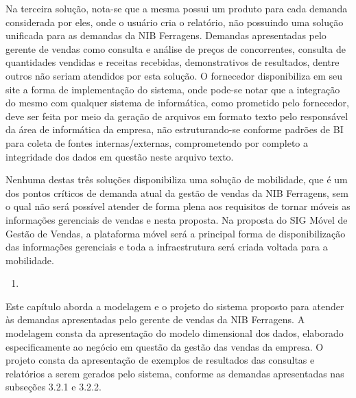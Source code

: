 \documentclass[a4paper]{article}
\newcounter{saveenum}
\newcommand\liststyleWWviiiNumi{%
\renewcommand\theenumi{\arabic{enumi}}
\renewcommand\theenumii{\arabic{enumi}.\arabic{enumii}}
\renewcommand\theenumiii{\arabic{enumi}.\arabic{enumii}.\arabic{enumiii}}
\renewcommand\theenumiv{\arabic{enumi}.\arabic{enumii}.\arabic{enumiii}.\arabic{enumiv}}
\renewcommand\labelenumi{\theenumi}
\renewcommand\labelenumii{\theenumii}
\renewcommand\labelenumiii{\theenumiii}
\renewcommand\labelenumiv{\theenumiv.}
}
\begin{document}
{
\textsf{Na terceira solu\c{c}\~ao, nota-se que a mesma possui um produto para cada demanda considerada por eles, onde o
usu\'ario cria o relat\'orio, n\~ao possuindo uma solu\c{c}\~ao unificada para as demandas da NIB Ferragens. Demandas
apresentadas pelo gerente de vendas como consulta e an\'alise de pre\c{c}os de concorrentes, consulta de quantidades
vendidas e receitas recebidas, demonstrativos de resultados, dentre outros n\~ao seriam atendidos por esta
solu\c{c}\~ao. O fornecedor disponibiliza em seu site a forma de implementa\c{c}\~ao do sistema, onde pode-se notar que
a integra\c{c}\~ao do mesmo com qualquer sistema de inform\'atica, como prometido pelo fornecedor, deve ser feita por
meio da gera\c{c}\~ao de arquivos em formato texto pelo respons\'avel da \'area de inform\'atica da empresa, n\~ao
estruturando-se conforme padr\~oes de BI para coleta de fontes internas/externas, comprometendo por completo a
integridade dos dados em quest\~ao neste arquivo texto.}}

{\sffamily
Nenhuma destas tr\^es solu\c{c}\~oes disponibiliza uma solu\c{c}\~ao de mobilidade, que \'e um dos pontos cr\'iticos de
demanda atual da gest\~ao de vendas da NIB Ferragens, sem o qual n\~ao ser\'a poss\'ivel atender de forma plena aos
requisitos de tornar m\'oveis as informa\c{c}\~oes gerenciais de vendas e nesta proposta. Na proposta do SIG M\'ovel de
Gest\~ao de Vendas, a plataforma m\'ovel ser\'a a principal forma de disponibiliza\c{c}\~ao das informa\c{c}\~oes
gerenciais e toda a infraestrutura ser\'a criada voltada para a mobilidade.}


\bigskip

\liststyleWWviiiNumi
\setcounter{saveenum}{\value{enumi}}
\begin{enumerate}
\setcounter{enumi}{\value{saveenum}}
\item {}
\end{enumerate}

\bigskip

{\sffamily
Este cap\'itulo aborda a modelagem e o projeto do sistema proposto para atender \`as demandas apresentadas pelo gerente
de vendas da NIB Ferragens. A modelagem consta da apresenta\c{c}\~ao do modelo dimensional dos dados, elaborado
especificamente ao neg\'ocio em quest\~ao da gest\~ao das vendas da empresa. O projeto consta da apresenta\c{c}\~ao de
exemplos de resultados das consultas e relat\'orios a serem gerados pelo sistema, conforme as demandas apresentadas nas
subse\c{c}\~oes 3.2.1 e 3.2.2.}
\end{document}
